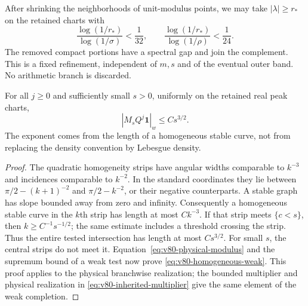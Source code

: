 After shrinking the neighborhoods of unit-modulus points, we may take
$|\lambda|\ge r_*$ on the retained charts with
\begin{equation}\label{eq:v80-peak-choice}
 \frac{\log(1/r_*)}{\log(1/\sigma)}<\frac1{32},\qquad
 \frac{\log(1/r_*)}{\log(1/\rho)}<\frac1{24}.
\end{equation}
The removed compact portions have a spectral gap and join the
complement. This is a fixed refinement, independent of $m,s$ and
of the eventual outer band. No arithmetic branch is discarded.

\begin{lemma}
\label{lem:v80-homogeneous-weak}
For all $j\ge0$ and sufficiently small $s>0$, uniformly on the
retained real peak charts,
\begin{equation}\label{eq:v80-homogeneous-weak}
             |M_s Q^j\mathbf1|_w\le Cs^{3/2}.
\end{equation}
The exponent comes from the length of a homogeneous stable curve,
not from replacing the density convention by Lebesgue density.
\end{lemma}
\begin{proof}
The quadratic homogeneity strips have angular widths comparable to
$k^{-3}$ and incidences comparable to $k^{-2}$. In the standard
coordinates they lie between
$\pi/2-(k+1)^{-2}$ and $\pi/2-k^{-2}$, or their negative counterparts.
A stable graph has slope bounded away from zero and infinity.
Consequently a homogeneous stable curve in the $k$th strip has
length at most $Ck^{-3}$. If that strip meets $\{c<s\}$, then
$k\ge C^{-1}s^{-1/2}$; the same estimate includes a threshold
crossing the strip. Thus the entire tested intersection has length
at most $Cs^{3/2}$. For small $s$, the central strips do not meet it.
Equation~\eqref{eq:v80-physical-modulus} and the supremum bound of a
weak test now prove \eqref{eq:v80-homogeneous-weak}. This proof applies
to the physical branchwise realization; the bounded multiplier and
physical realization in \eqref{eq:v80-inherited-multiplier} give the
same element of the weak completion.
\end{proof}

